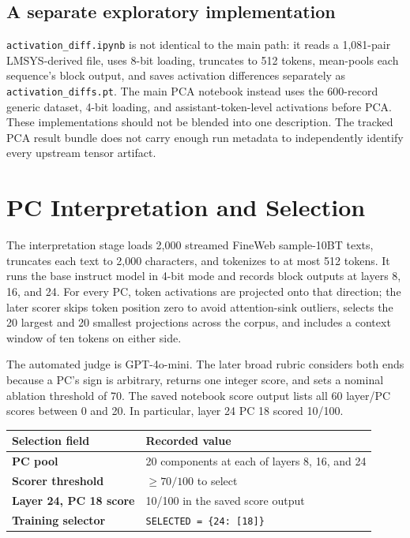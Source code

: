 \documentclass[11pt]{article}
\begin{document}
\subsection{A separate exploratory implementation}
\texttt{activation\_diff.ipynb} is not identical to the main path: it reads a 1,081-pair LMSYS-derived file, uses 8-bit loading, truncates to 512 tokens, mean-pools each sequence's block output, and saves activation differences separately as \texttt{activation\_diffs.pt}. The main PCA notebook instead uses the 600-record generic dataset, 4-bit loading, and assistant-token-level activations before PCA. These implementations should not be blended into one description. The tracked PCA result bundle does not carry enough run metadata to independently identify every upstream tensor artifact.

\newpage
\section{PC Interpretation and Selection}
The interpretation stage loads 2,000 streamed FineWeb sample-10BT texts, truncates each text to 2,000 characters, and tokenizes to at most 512 tokens. It runs the base instruct model in 4-bit mode and records block outputs at layers 8, 16, and 24. For every PC, token activations are projected onto that direction; the later scorer skips token position zero to avoid attention-sink outliers, selects the 20 largest and 20 smallest projections across the corpus, and includes a context window of ten tokens on either side.

The automated judge is GPT-4o-mini. The later broad rubric considers both ends because a PC's sign is arbitrary, returns one integer score, and sets a nominal ablation threshold of 70. The saved notebook score output lists all 60 layer/PC scores between 0 and 20. In particular, layer 24 PC 18 scored 10/100.

\begin{center}
\renewcommand{\arraystretch}{1.2}
\begin{tabularx}{0.82\textwidth}{>{\bfseries}p{}X}
\toprule
Selection field & Recorded value \\
\midrule
PC pool & 20 components at each of layers 8, 16, and 24 \\
Scorer threshold & $\geq 70/100$ to select \\
Layer 24, PC 18 score & 10/100 in the saved score output \\
Training selector & \texttt{SELECTED = \{24: [18]\}} \\
\bottomrule
\end{tabularx}
\end{center}
\end{document}
